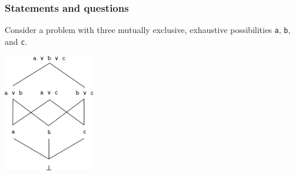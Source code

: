 \documentclass{beamer}
\begin{document}
\begin{frame}
\frametitle{Statements and questions}
Consider a problem with three mutually exclusive, exhaustive possibilities
\texttt{a}, \texttt{b}, and \texttt{c}.


\begin{center}
  \includegraphics[width=0.3\textwidth]{lattice1.pdf}
\end{center}

\end{frame}
\end{document}
